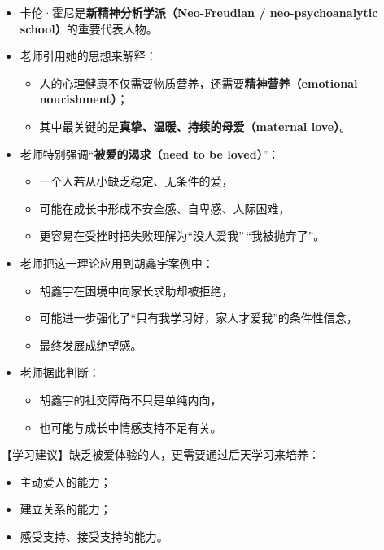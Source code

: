 \documentclass[
  chinese,
  9pt,
  a4paper,
]{ctexart}
\providecommand{\tightlist}{%
  \setlength{\itemsep}{0pt}\setlength{\parskip}{0pt}}
\begin{document}
\begin{itemize}
\item
  卡伦·霍尼是\textbf{新精神分析学派（Neo-Freudian / neo-psychoanalytic
  school）}的重要代表人物。
\item
  老师引用她的思想来解释：

  \begin{itemize}
  \tightlist
  \item
    人的心理健康不仅需要物质营养，还需要\textbf{精神营养（emotional
    nourishment）}；
  \item
    其中最关键的是\textbf{真挚、温暖、持续的母爱（maternal love）}。
  \end{itemize}
\item
  老师特别强调``\textbf{被爱的渴求（need to be loved）}''：

  \begin{itemize}
  \tightlist
  \item
    一个人若从小缺乏稳定、无条件的爱，
  \item
    可能在成长中形成不安全感、自卑感、人际困难，
  \item
    更容易在受挫时把失败理解为``没人爱我''\,``我被抛弃了''。
  \end{itemize}
\item
  老师把这一理论应用到胡鑫宇案例中：

  \begin{itemize}
  \tightlist
  \item
    胡鑫宇在困境中向家长求助却被拒绝，
  \item
    可能进一步强化了``只有我学习好，家人才爱我''的条件性信念，
  \item
    最终发展成绝望感。
  \end{itemize}
\item
  老师据此判断：

  \begin{itemize}
  \tightlist
  \item
    胡鑫宇的社交障碍不只是单纯内向，
  \item
    也可能与成长中情感支持不足有关。
  \end{itemize}
\end{itemize}

【学习建议】缺乏被爱体验的人，更需要通过后天学习来培养：

\begin{itemize}
\tightlist
\item
  主动爱人的能力；
\item
  建立关系的能力；
\item
  感受支持、接受支持的能力。
\end{itemize}
\end{document}

